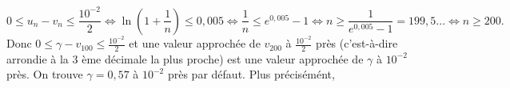 {\begin{enumerate}
{$$0\leq u_n-v_n\leq\frac{10^{-2}}{2}\Leftrightarrow\ln\left(1+\frac{1}{n}\right)\leq0,005\Leftrightarrow\frac{1}{n}\leq e^{0,005}-1\Leftrightarrow n\geq\frac{1}{e^{0,005}-1}=199,5...\Leftrightarrow n\geq200.$$
Donc $0\leq\gamma-v_{100}\leq\frac{10^{-2}}{2}$ et une valeur approchée de $v_{200}$ à $\frac{10^{-2}}{2}$ près (c'est-à-dire arrondie à la 3 ème décimale la plus proche) est une valeur approchée de $\gamma$ à $10^{-2}$ près. On trouve $\gamma=0,57$ à $10^{-2}$ près par défaut. Plus précisémént,

\begin{center}
\end{center}}
\end{enumerate}
}

